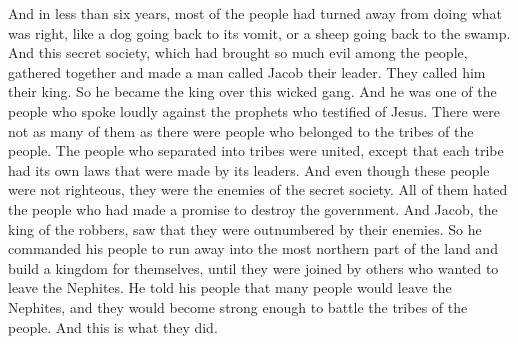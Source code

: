 And in less than six years, most of the people had turned away from doing what was right, like a dog going back to its vomit, or a sheep going back to the swamp.
\bverse \iffalse Now this secret combination, which had brought so great iniquity upon the people, did gather themselves together, and did place at their head a man whom they did call Jacob; \fi
And this secret society, which had brought so much evil among the people, gathered together and made a man called Jacob their leader.
\bverse \iffalse And they did call him their king; therefore he became a king over this wicked band; and he was one of the chiefest who had given his voice against the prophets who testified of Jesus. \fi
They called him their king. So he became the king over this wicked gang. And he was one of the people who spoke loudly against the prophets who testified of Jesus.
\bverse \iffalse And it came to pass that they were not so strong in number as the tribes of the people, who were united together save it were their leaders did establish their laws, every one according to his tribe; nevertheless they were enemies; notwithstanding they were not a righteous people, yet they were united in the hatred of those who had entered into a covenant to destroy the government. \fi
There were not as many of them as there were people who belonged to the tribes of the people. The people who separated into tribes were united, except that each tribe had its own laws that were made by its leaders. And even though these people were not righteous, they were the enemies of the secret society. All of them hated the people who had made a promise to destroy the government.
\bverse \iffalse Therefore, Jacob seeing that their enemies were more numerous than they, he being the king of the band, therefore he commanded his people that they should take their flight into the northernmost part of the land, and there build up unto themselves a kingdom, until they were joined by dissenters, (for he flattered them that there would be many dissenters) and they become sufficiently strong to contend with the tribes of the people; and they did so. \fi
And Jacob, the king of the robbers, saw that they were outnumbered by their enemies. So he commanded his people to run away into the most northern part of the land and build a kingdom for themselves, until they were joined by others who wanted to leave the Nephites. He told his people that many people would leave the Nephites, and they would become strong enough to battle the tribes of the people. And this is what they did.

